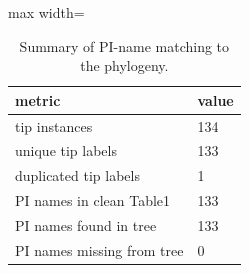 \begin{table}
\caption{Summary of PI-name matching to the phylogeny.}
\label{tab:tree_summary}
\begin{adjustbox}{max width=\textwidth}
\begin{tabular}{ll}
\toprule
metric & value \\
\midrule
tip instances & 134 \\
unique tip labels & 133 \\
duplicated tip labels & 1 \\
PI names in clean Table1 & 133 \\
PI names found in tree & 133 \\
PI names missing from tree & 0 \\
\bottomrule
\end{tabular}
\end{adjustbox}
\end{table}
